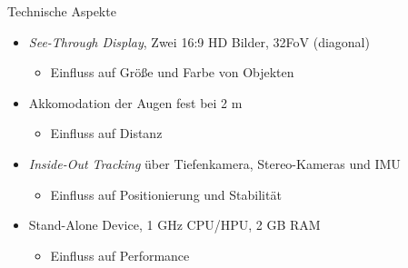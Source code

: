 \begin{frame}[fragile]{Technische Aspekte}
		\begin{itemize}
			\item \textit{See-Through Display}, Zwei 16:9 HD Bilder, 32\degree FoV (diagonal)
			\begin{itemize}[topsep=-5px]
				\setlength{\itemsep}{-5px}
				\item Einfluss auf Größe und Farbe von Objekten
			\end{itemize}
			\pause
			\item Akkomodation der Augen fest bei 2 m
			\begin{itemize}[topsep=-5px]
				\setlength{\itemsep}{-5px}
				\item Einfluss auf Distanz
			\end{itemize}
			\item \textit{Inside-Out Tracking} über Tiefenkamera, Stereo-Kameras und IMU
			\begin{itemize}[topsep=-5px]
				\setlength{\itemsep}{-5px}
				\item Einfluss auf Positionierung und Stabilität
			\end{itemize}
			\pause
			\item Stand-Alone Device, 1 GHz CPU/HPU, 2 GB RAM
			\begin{itemize}[topsep=-5px]
				\setlength{\itemsep}{-5px}
				\item Einfluss auf Performance
			\end{itemize}
		\end{itemize}
\end{frame}

